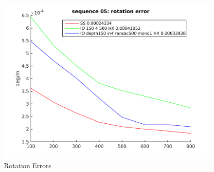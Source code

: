 \documentclass[runningheads]{llncs}
\begin{document}
\begin{figure}
\begin{minipage}[t]{.3\linewidth}
    \includegraphics[width=\textwidth]{rotation_error_05}
  \end{minipage}
  \caption{Rotation Errors}
\end{figure}
\end{document}
